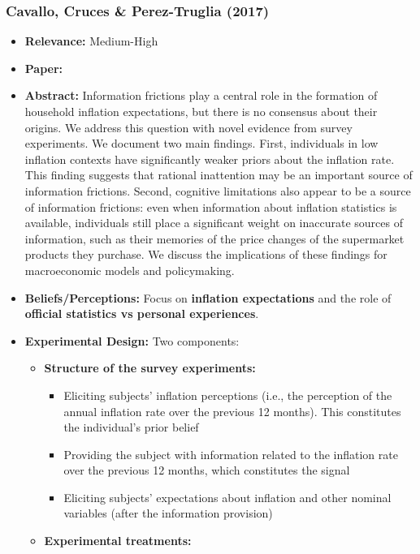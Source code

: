 \documentclass[a4paper, 12pt]{article}
\begin{document}
\subsubsection*{Cavallo, Cruces \& Perez-Truglia (2017)}
\begin{itemize}
    \item \textbf{Relevance:} Medium-High
    \item \textbf{Paper:} 
    \item \textbf{Abstract:} Information frictions play a central role in the formation of household inflation expectations, but there is no consensus about their origins. We address this question with novel evidence from survey experiments. We document two main findings. First, individuals in low inflation contexts have significantly weaker priors about the inflation rate. This finding suggests that rational inattention may be an important source of information frictions. Second, cognitive limitations also appear to be a source of information frictions: even when information about inflation statistics is available, individuals still place a significant weight on inaccurate sources of information, such as their memories of the price changes of the supermarket products they purchase. We discuss the implications of these findings for macroeconomic models and policymaking.
    \item \textbf{Beliefs/Perceptions:} Focus on \textbf{inflation expectations} and the role of \textbf{official statistics vs personal experiences}.
    \item \textbf{Experimental Design:} Two components:
    \begin{itemize}
        \item \textbf{Structure of the survey experiments:} 
        \begin{itemize}
            \item Eliciting	subjects’ inflation	perceptions	(i.e., the perception of the annual inflation rate over the previous 12 months). This constitutes the individual’s prior belief 
            \item Providing the subject with information related to the inflation rate over the previous 12 months, which constitutes the signal
            \item Eliciting subjects' expectations about inflation and other nominal variables (after the information provision)
        \end{itemize}
        \item \textbf{Experimental treatments:}

\end{itemize}
\end{itemize}
\end{document}
